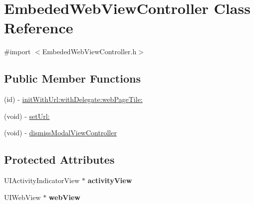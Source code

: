 \hypertarget{interface_embeded_web_view_controller}{
\section{EmbededWebViewController Class Reference}
\label{interface_embeded_web_view_controller}
}


{\ttfamily \#import $<$EmbededWebViewController.h$>$}

\subsection*{Public Member Functions}
\begin{DoxyCompactItemize}
\item 
(id) -\/ \hyperlink{interface_embeded_web_view_controller_a1a41a25054534bbfe58dbd532a0ad20c}{initWithUrl:withDelegate:webPageTile:}
\item 
(void) -\/ \hyperlink{interface_embeded_web_view_controller_a8789af10370392b32681d8ec2fb9da5b}{setUrl:}
\item 
(void) -\/ \hyperlink{interface_embeded_web_view_controller_a76dead6bd39f1dac6698b900af51aaf7}{dismissModalViewController}
\end{DoxyCompactItemize}
\subsection*{Protected Attributes}
\begin{DoxyCompactItemize}
\item 
\hypertarget{interface_embeded_web_view_controller_a9f11869bf3acaf21100d18c6f33a4822}{
UIActivityIndicatorView $\ast$ {\bfseries activityView}}
\label{interface_embeded_web_view_controller_a9f11869bf3acaf21100d18c6f33a4822}

\item 
\hypertarget{interface_embeded_web_view_controller_a16abb2d2c8f975f97faca846ca0ceb0c}{
UIWebView $\ast$ {\bfseries webView}}
\label{interface_embeded_web_view_controller_a16abb2d2c8f975f97faca846ca0ceb0c}

\end{DoxyCompactItemize}
